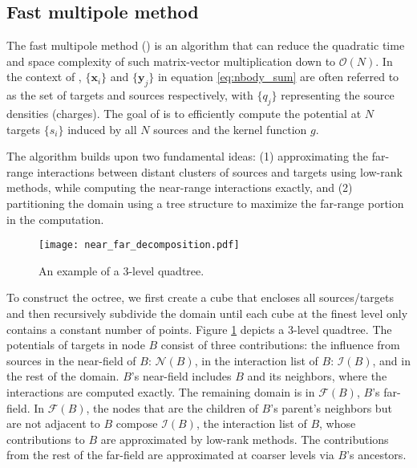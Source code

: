 \subsection{Fast multipole method}

The fast multipole method (\fmm) is an algorithm that can reduce the quadratic time and space complexity of such matrix-vector multiplication down to $\mathcal{O}(N)$.
In the context of \fmm, $\{\mathbf{x}_i\}$ and $\{\mathbf{y}_j\}$ in equation \ref{eq:nbody_sum} are often referred to as the set of targets and sources respectively, with $\{q_j\}$ representing the source densities (charges).
The goal of \fmm is to efficiently compute the potential at $N$ targets $\{s_i\}$ induced by all $N$ sources and the kernel function $g$.

The \fmm algorithm builds upon two fundamental ideas: (1) approximating the far-range interactions between distant clusters of sources and targets using low-rank methods, while computing the near-range interactions exactly, and (2) partitioning the domain using a tree structure to maximize the far-range portion in the computation.

\begin{figure}
    \centering
    \texttt{[image: near\_far\_decomposition.pdf]}
    \caption{An example of a 3-level quadtree.}
    \label{fig:near_far_decomp}
\end{figure}

To construct the octree, we first create a cube that encloses all sources/targets and then recursively subdivide the domain until each cube at the finest level only contains a constant number of points.
Figure \ref{fig:near_far_decomp} depicts a 3-level quadtree.
The potentials of targets in node $B$ consist of three contributions: the influence from sources in the near-field of $B$: $\mathcal{N}(B)$, in the interaction list of $B$: $\mathcal{I}(B)$, and in the rest of the domain.
$B$'s near-field includes $B$ and its neighbors, where the interactions are computed exactly.
The remaining domain is in $\mathcal{F}(B)$, $B$'s far-field.
In $\mathcal{F}(B)$, the nodes that are the children of $B$'s parent's neighbors but are not adjacent to $B$ compose $\mathcal{I}(B)$, the interaction list of $B$, whose contributions to $B$ are approximated by low-rank methods.
The contributions from the rest of the far-field are approximated at coarser levels via $B$'s ancestors.

